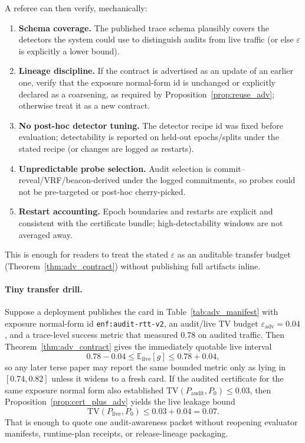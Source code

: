 \documentclass[11pt]{article}
\newcommand{\TV}{\mathrm{TV}}
\newcommand{\E}{\mathbb{E}}
\begin{document}
A referee can then verify, mechanically:
\begin{enumerate}
\item \textbf{Schema coverage.} The published trace schema plausibly covers the detectors the system could use to distinguish audits from live traffic (or else $\varepsilon$ is explicitly a lower bound).
\item \textbf{Lineage discipline.} If the contract is advertised as an update of an earlier one, verify that the exposure normal-form id is unchanged or explicitly declared as a coarsening, as required by Proposition~\ref{prop:reuse_adv}; otherwise treat it as a new contract.
\item \textbf{No post-hoc detector tuning.} The detector recipe id was fixed before evaluation; detectability is reported on held-out epochs/splits under the stated recipe (or changes are logged as restarts).
\item \textbf{Unpredictable probe selection.} Audit selection is commit--reveal/VRF/beacon-derived under the logged commitments, so probes could not be pre-targeted or post-hoc cherry-picked.
\item \textbf{Restart accounting.} Epoch boundaries and restarts are explicit and consistent with the certificate bundle; high-detectability windows are not averaged away.
\end{enumerate}
This is enough for readers to treat the stated $\varepsilon$ as an auditable transfer budget (Theorem~\ref{thm:adv_contract}) without publishing full artifacts inline.

\paragraph{Tiny transfer drill.}
Suppose a deployment publishes the card in Table~\ref{tab:adv_manifest} with exposure normal-form id \texttt{enf:audit-rtt-v2}, an audit/live TV budget $\varepsilon_{\mathrm{adv}}=0.04$, and a trace-level success metric that measured $0.78$ on audited traffic.
Then Theorem~\ref{thm:adv_contract} gives the immediately quotable live interval
\[
0.78 - 0.04 \le \E_{\mathrm{live}}[g] \le 0.78 + 0.04,
\]
so any later terse paper may report the same bounded metric only as lying in $[0.74,0.82]$ unless it widens to a fresh card.
If the audited certificate for the same exposure normal form also established $\TV(P_{\mathrm{audit}},P_0)\le 0.03$, then Proposition~\ref{prop:cert_plus_adv} yields the live leakage bound
\[
\TV(P_{\mathrm{live}},P_0) \le 0.03 + 0.04 = 0.07.
\]
That is enough to quote one audit-awareness packet without reopening evaluator manifests, runtime-plan receipts, or release-lineage packaging.
\end{document}
